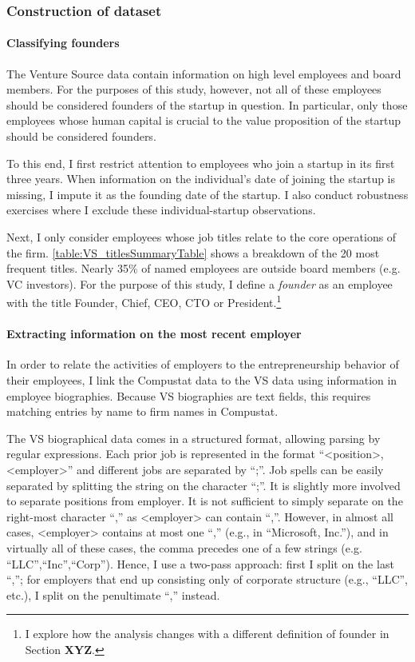 \documentclass[11pt,english]{article}
\begin{document}
\subsubsection{Construction of dataset}

\paragraph{Classifying founders}

The Venture Source data contain information on high level employees and board members. For the purposes of this study, however, not all of these employees should be considered founders of the startup in question. In particular, only those employees whose human capital is crucial to the value proposition of the startup should be considered founders. 

To this end, I first restrict attention to employees who join a startup in its first three years. When information on the individual's date of joining the startup is missing, I impute it as the founding date of the startup. I also conduct robustness exercises where I exclude these individual-startup observations. 

Next, I only consider employees whose job titles relate to the core operations of the firm. \autoref{table:VS_titlesSummaryTable} shows a breakdown of the 20 most frequent titles. Nearly 35\% of named employees are outside board members (e.g. VC investors). For the purpose of this study, I define a \textit{founder} as an employee with the title Founder, Chief, CEO, CTO or President.\footnote{I explore how the analysis changes with a different definition of founder in Section \textbf{XYZ}.}



\paragraph{Extracting information on the most recent employer}

In order to relate the activities of employers to the entrepreneurship behavior of their employees, I link the Compustat data to the VS data using information in employee biographies. Because VS biographies are text fields, this requires matching entries by name to firm names in Compustat.  

The VS biographical data comes in a structured format, allowing parsing by regular expressions. Each prior job is represented in the format ``<position>, <employer>'' and different jobs are separated by ``;''. Job spells can be easily separated by splitting the string on the character ``;''. It is slightly more involved to separate positions from employer. It is not sufficient to simply separate on the right-most character ``,'' as <employer> can contain ``,''. However, in almost all cases, <employer> contains at most one ``,'' (e.g., in ``Microsoft, Inc.''), and in virtually all of these cases, the comma precedes one of a few strings (e.g. ``LLC'',``Inc'',``Corp''). Hence, I use a two-pass approach: first I split on the last ``,''; for employers that end up consisting only of corporate structure (e.g., ``LLC'', etc.), I split on the penultimate ``,'' instead. 
\end{document}
